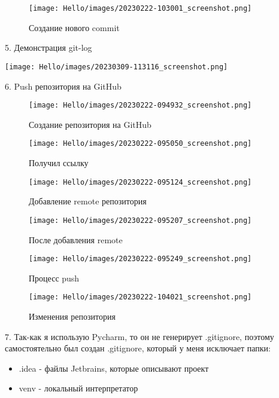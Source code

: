 \documentclass[a4paper,14pt]{extarticle}
\begin{document}
\begin{figure}[htbp]
\centering
\texttt{[image: Hello/images/20230222-103001\_screenshot.png]}
\caption{Создание нового commit}
\end{figure}


​5. Демонстрация git-log

\begin{center}
\texttt{[image: Hello/images/20230309-113116\_screenshot.png]}
\end{center}

\clearpage

​6. Push репозитория на GitHub

\begin{figure}[htbp]
\centering
\texttt{[image: Hello/images/20230222-094932\_screenshot.png]}
\caption{Создание репозитория на GitHub}
\end{figure}

\begin{figure}[htbp]
\centering
\texttt{[image: Hello/images/20230222-095050\_screenshot.png]}
\caption{Получил ссылку}
\end{figure}

\begin{figure}[htbp]
\centering
\texttt{[image: Hello/images/20230222-095124\_screenshot.png]}
\caption{Добавление remote репозитория}
\end{figure}

\begin{figure}[htbp]
\centering
\texttt{[image: Hello/images/20230222-095207\_screenshot.png]}
\caption{После добавления remote}
\end{figure}


\begin{figure}[htbp]
\centering
\texttt{[image: Hello/images/20230222-095249\_screenshot.png]}
\caption{Процесс push}
\end{figure}


\begin{figure}[htbp]
\centering
\texttt{[image: Hello/images/20230222-104021\_screenshot.png]}
\caption{Изменения репозитория}
\end{figure}

\clearpage

​7. Так-как я использую Pycharm, то он не генерирует .gitignore, поэтому самостоятельно был создан .gitignore, который у меня исключает папки:
\begin{itemize}
\item .idea - файлы Jetbrains, которые описывают проект
\item venv - локальный интерпретатор
\end{itemize}
\end{document}
